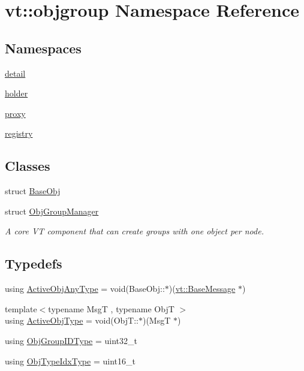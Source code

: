 \hypertarget{namespacevt_1_1objgroup}{}\section{vt\+:\+:objgroup Namespace Reference}
\label{namespacevt_1_1objgroup}
\subsection*{Namespaces}
\begin{DoxyCompactItemize}
\item 
 \hyperlink{namespacevt_1_1objgroup_1_1detail}{detail}
\item 
 \hyperlink{namespacevt_1_1objgroup_1_1holder}{holder}
\item 
 \hyperlink{namespacevt_1_1objgroup_1_1proxy}{proxy}
\item 
 \hyperlink{namespacevt_1_1objgroup_1_1registry}{registry}
\end{DoxyCompactItemize}
\subsection*{Classes}
\begin{DoxyCompactItemize}
\item 
struct \hyperlink{structvt_1_1objgroup_1_1_base_obj}{Base\+Obj}
\item 
struct \hyperlink{structvt_1_1objgroup_1_1_obj_group_manager}{Obj\+Group\+Manager}
\begin{DoxyCompactList}\small\item\em A core VT component that can create groups with one object per node. \end{DoxyCompactList}\end{DoxyCompactItemize}
\subsection*{Typedefs}
\begin{DoxyCompactItemize}
\item 
using \hyperlink{namespacevt_1_1objgroup_a25bec5d3c8e8bb02b62280eec62b8ac7}{Active\+Obj\+Any\+Type} = void(Base\+Obj\+::$\ast$)(\hyperlink{namespacevt_ac34f95a5e2b8109b55bfba52b074443d}{vt\+::\+Base\+Message} $\ast$)
\item 
{\footnotesize template$<$typename MsgT , typename ObjT $>$ }\\using \hyperlink{namespacevt_1_1objgroup_a979bd9dc714fdacafc4b83f98271bc23}{Active\+Obj\+Type} = void(Obj\+T\+::$\ast$)(MsgT $\ast$)
\item 
using \hyperlink{namespacevt_1_1objgroup_a54a50ff6833bf618e5bedb9a3b6d0e07}{Obj\+Group\+I\+D\+Type} = uint32\+\_\+t
\item 
using \hyperlink{namespacevt_1_1objgroup_a378e4b966221779c74f3a2f921eb2421}{Obj\+Type\+Idx\+Type} = uint16\+\_\+t
\end{DoxyCompactItemize}
